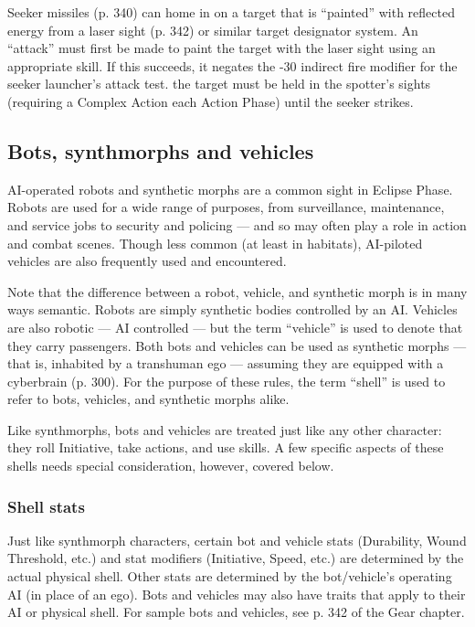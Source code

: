 Seeker missiles (p. 340) can home in on a target that is ``painted'' with reflected energy from a laser sight (p. 342) or similar target designator system. An ``attack'' must first be made to paint the target with the laser sight using an appropriate skill. If this succeeds, it negates the -30 indirect fire modifier for the seeker launcher’s attack test. the target must be held in the spotter’s sights (requiring a Complex Action each Action Phase) until the seeker strikes.


\subsection{Bots, synthmorphs and vehicles}
\label{sec:bots-synthmorphs-vehicles}

AI-operated robots and synthetic morphs are a common sight in Eclipse Phase. Robots are used for a wide range of purposes, from surveillance, maintenance, and service jobs to security and policing --- and so may often play a role in action and combat scenes. Though less common (at least in habitats), AI-piloted vehicles are also frequently used and encountered.

Note that the difference between a robot, vehicle, and synthetic morph is in many ways semantic. Robots are simply synthetic bodies controlled by an AI. Vehicles are also robotic --- AI controlled --- but the term ``vehicle'' is used to denote that they carry passengers. Both bots and vehicles can be used as synthetic morphs --- that is, inhabited by a transhuman ego --- assuming they are equipped with a cyberbrain (p. 300). For the purpose of these rules, the term ``shell'' is used to refer to bots, vehicles, and synthetic morphs alike.

Like synthmorphs, bots and vehicles are treated just like any other character: they roll Initiative, take actions, and use skills. A few specific aspects of these shells needs special consideration, however, covered below.

\subsubsection{Shell stats}

Just like synthmorph characters, certain bot and vehicle stats (Durability, Wound Threshold, etc.) and stat modifiers (Initiative, Speed, etc.) are determined by the actual physical shell. Other stats are determined by the bot/vehicle’s operating AI (in place of an ego). Bots and vehicles may also have traits that apply to their AI or physical shell. For sample bots and vehicles, see p. 342 of the Gear chapter.

